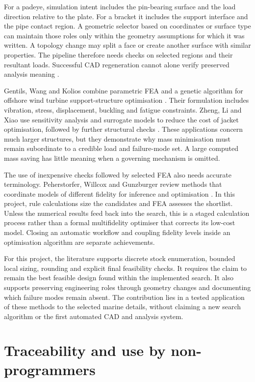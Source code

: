 For a padeye, simulation intent includes the pin-bearing surface and the load direction relative to the plate. For a bracket it includes the support interface and the pipe contact region. A geometric selector based on coordinates or surface type can maintain those roles only within the geometry assumptions for which it was written. A topology change may split a face or create another surface with similar properties. The pipeline therefore needs checks on selected regions and their resultant loads. Successful CAD regeneration cannot alone verify preserved analysis meaning \cite{nolan2015}.

Gentils, Wang and Kolios combine parametric FEA and a genetic algorithm for offshore wind turbine support-structure optimisation \cite{gentils2017}. Their formulation includes vibration, stress, displacement, buckling and fatigue constraints. Zheng, Li and Xiao use sensitivity analysis and surrogate models to reduce the cost of jacket optimisation, followed by further structural checks \cite{zheng2023}. These applications concern much larger structures, but they demonstrate why mass minimisation must remain subordinate to a credible load and failure-mode set. A large computed mass saving has little meaning when a governing mechanism is omitted.

The use of inexpensive checks followed by selected FEA also needs accurate terminology. Peherstorfer, Willcox and Gunzburger review methods that coordinate models of different fidelity for inference and optimisation \cite{peherstorfer2018}. In this project, rule calculations size the candidates and FEA assesses the shortlist. Unless the numerical results feed back into the search, this is a staged calculation process rather than a formal multifidelity optimiser that corrects its low-cost model. Closing an automatic workflow and coupling fidelity levels inside an optimisation algorithm are separate achievements.

For this project, the literature supports discrete stock enumeration, bounded local sizing, rounding and explicit final feasibility checks. It requires the claim to remain the best feasible design found within the implemented search. It also supports preserving engineering roles through geometry changes and documenting which failure modes remain absent. The contribution lies in a tested application of these methods to the selected marine details, without claiming a new search algorithm or the first automated CAD and analysis system.

\section{Traceability and use by non-programmers}
\label{sec:lit-traceability}

